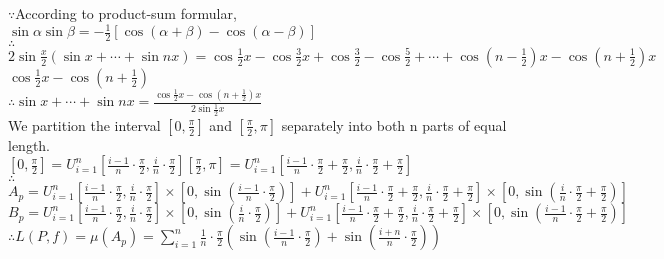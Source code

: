 \documentclass{article}
\begin{document}
$\because$\qquad According to product-sum formular, $\displaystyle\sin\alpha\sin\beta=-\frac{1}{2}[\cos(\alpha+\beta)-\cos(\alpha-\beta)]$\\

$\therefore$\qquad$\displaystyle2\sin\frac{x}{2}(\sin x+\cdots+\sin nx)=\cos\frac{1}{2}x-\cos\frac{3}{2}x+\cos\frac{3}{2}-\cos\frac{5}{2}+\cdots+\cos\left(n-\frac{1}{2}\right)x-\cos\left(n+\frac{1}{2}\right)x$\\

\qquad\qquad\qquad\qquad\qquad\qquad\qquad\qquad$\displaystyle\cos\frac{1}{2}x-\cos\left(n+\frac{1}{2}\right)$\\

$\therefore$\qquad$\displaystyle\sin x+\cdots+\sin nx=\frac{\cos\frac{1}{2}x-\cos\left(n+\frac{1}{2}\right)x}{2\sin\frac{1}{2}x}$\\

We partition the interval $[0,\frac{\pi}{2}]$ and $[\frac{\pi}{2},\pi]$ separately into both n parts of equal length.\\

$\displaystyle\left[0,\frac{\pi}{2}\right]=U_{i=1}^n\left[\frac{i-1}{n}\cdot\frac{\pi}{2},\frac{i}{n}\cdot\frac{\pi}{2}\right]$\qquad$\displaystyle\left[\frac{\pi}{2},\pi\right]=U_{i=1}^n\left[\frac{i-1}{n}\cdot\frac{\pi}{2}+\frac{\pi}{2},\frac{i}{n}\cdot\frac{\pi}{2}+\frac{\pi}{2}\right]$\\

$\therefore$\qquad$\displaystyle A_p=U_{i=1}^n\left[\frac{i-1}{n}\cdot\frac{\pi}{2},\frac{i}{n}\cdot\frac{\pi}{2}\right]\times\left[0,\sin\left(\frac{i-1}{n}\cdot\frac{\pi}{2}\right)\right]+U_{i=1}^n\left[\frac{i-1}{n}\cdot\frac{\pi}{2}+\frac{\pi}{2},\frac{i}{n}\cdot\frac{\pi}{2}+\frac{\pi}{2}\right]\times\left[0,\sin\left(\frac{i}{n}\cdot\frac{\pi}{2}+\frac{\pi}{2}\right)\right]$\\

\qquad\quad $\displaystyle B_p=U_{i=1}^n\left[\frac{i-1}{n}\cdot\frac{\pi}{2},\frac{i}{n}\cdot\frac{\pi}{2}\right]\times\left[0,\sin\left(\frac{i}{n}\cdot\frac{\pi}{2}\right)\right]+U_{i=1}^n\left[\frac{i-1}{n}\cdot\frac{\pi}{2}+\frac{\pi}{2},\frac{i}{n}\cdot\frac{\pi}{2}+\frac{\pi}{2}\right]\times\left[0,\sin\left(\frac{i-1}{n}\cdot\frac{\pi}{2}+\frac{\pi}{2}\right)\right]$\\

$\therefore$\qquad$\displaystyle L(P,f)=\mu(A_p)=\sum \limits_{i=1}^n\frac{1}{n}\cdot\frac{\pi}{2}\left(\sin\left(\frac{i-1}{n}\cdot\frac{\pi}{2}\right)+\sin\left(\frac{i+n}{n}\cdot\frac{\pi}{2}\right)\right)$\\
\end{document}
